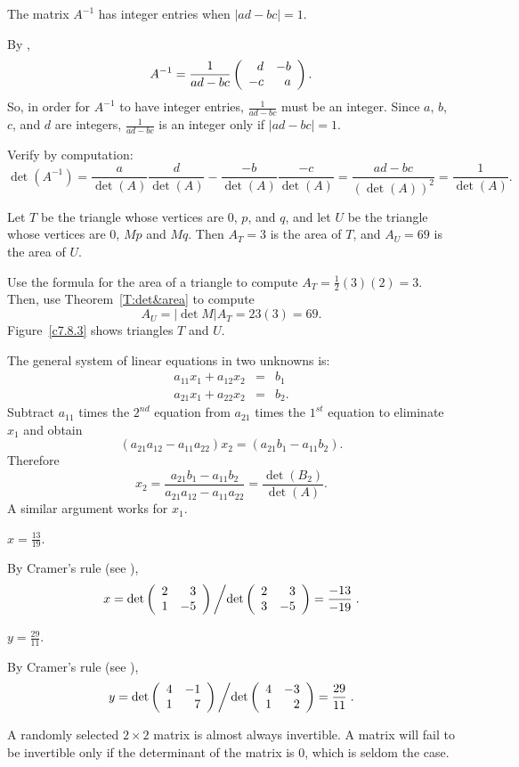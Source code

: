 \ans The matrix $A^{-1}$ has integer entries when $|ad - bc| = 1$.

\soln By ,
\[
A^{-1} = \frac{1}{ad-bc}\left(\begin{array}{rr} d & -b\\ -c &a\end{array}\right).
\]
So, in order for $A^{-1}$ to have integer entries, $\frac{1}{ad-bc}$
must be an integer.  Since $a$, $b$, $c$, and $d$ are integers,
$\frac{1}{ad - bc}$ is an integer only if $|ad - bc| = 1$.


Verify by computation:
\[ \det(A^{-1}) = \frac{a}{\det(A)}\frac{d}{\det(A)} -
\frac{-b}{\det(A)}\frac{-c}{\det(A)} = \frac{ad - bc}{(\det(A))^2} =
\frac{1}{\det(A)}. \]

\ans Let $T$ be the triangle whose vertices are $0$, $p$, and $q$, and
let $U$ be the triangle whose vertices are $0$, $Mp$ and $Mq$.  Then
$A_T = 3$ is the area of $T$, and $A_U = 69$ is the area of $U$.

\soln Use the formula for the area of a triangle to compute
$A_T = \frac{1}{2}(3)(2) = 3$.  Then, use Theorem~\ref{T:det&area} to
compute
\[
A_U = |\det{M}|A_T = 23(3) = 69.
\]
Figure~\ref{c7.8.3} shows triangles $T$ and $U$.

\begin{figure}[htb]
		\centerline{%
		}
\end{figure}

The general system of linear equations in two unknowns is:
\begin{eqnarray*}
a_{11}x_1+a_{12}x_2 & = & b_1\\
a_{21}x_1+a_{22}x_2 & = & b_2.
\end{eqnarray*}
Subtract $a_{11}$ times the $2^{nd}$ equation from $a_{21}$ times the $1^{st}$ 
equation to eliminate $x_1$ and obtain
\[
(a_{21}a_{12}-a_{11}a_{22})x_2 = (a_{21}b_1-a_{11}b_2).
\]
Therefore
\[
x_2 =  \frac{a_{21}b_1-a_{11}b_2}{a_{21}a_{12}-a_{11}a_{22}}
= \frac{\det(B_2)}{\det(A)}.
\]
A similar argument works for $x_1$.

  \ans  $x=\frac{13}{19}$.

\soln By Cramer's rule (see ),
\[
x = \det\left(\begin{array}{rr} 2 & 3\\ 1 &-5\end{array}\right)\left/\det\left(\begin{array}{rr} 2 & 3\\ 3 &-5\end{array}\right)=\frac{-13}{-19}\right..
\]
 

 \ans  $y=\frac{29}{11}$.

\soln By Cramer's rule (see ),
\[
y = \det\left(\begin{array}{rr} 4 & -1\\ 1 &7\end{array}\right)\left/\det\left(\begin{array}{rr} 4 & -3\\ 1 &2\end{array}\right)=\frac{29}{11}\right..
\]

A randomly selected $2 \times 2$ matrix is almost always invertible.
A matrix will fail to be invertible only if the determinant of the
matrix is $0$, which is seldom the case.

